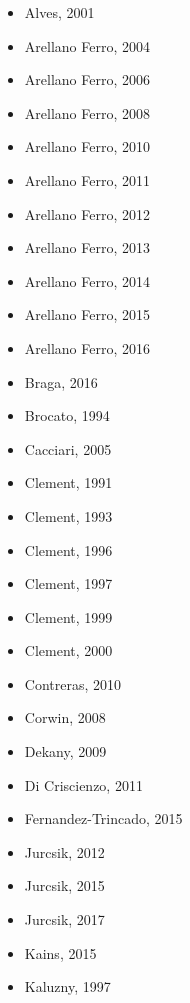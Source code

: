 \documentclass[]{article}
\begin{document}
\begin{itemize}
	\item Alves, 2001 \cite{alves_2001}
	\item Arellano Ferro, 2004 \cite{arellano_ferro_2004}
	\item Arellano Ferro, 2006 \cite{arellano_ferro_2006}
	\item Arellano Ferro, 2008 \cite{arellano_ferro_2008}
	\item Arellano Ferro, 2010 \cite{arellano_ferro_2010}
	\item Arellano Ferro, 2011 \cite{arellano_ferro_2011}
	\item Arellano Ferro, 2012 \cite{arellano_ferro_2012}
	\item Arellano Ferro, 2013 \cite{arellano_ferro_2013}
	\item Arellano Ferro, 2014 \cite{arellano_ferro_2014}
	\item Arellano Ferro, 2015 \cite{arellano_ferro_2015}
	\item Arellano Ferro, 2016 \cite{arellano_ferro_2016}
	\item Braga, 2016 \cite{braga_2016}
	\item Brocato, 1994 \cite{brocato_1994}
	\item Cacciari, 2005 \cite{cacciari_2005}
	\item Clement, 1991 \cite{clement_1991_b}
	\item Clement, 1993 \cite{clement_1993}
	\item Clement, 1996 \cite{clement_1996}
	\item Clement, 1997 \cite{clement_1997}
	\item Clement, 1999 \cite{clement_1999}
	\item Clement, 2000 \cite{clement_2000}
	\item Contreras, 2010 \cite{contreras_2010}
	\item Corwin, 2008 \cite{corwin_2008}
	\item Dekany, 2009 \cite{dekany_2009}
	\item Di Criscienzo, 2011 \cite{di_criscienzo_2011_b}
	\item Fernandez-Trincado, 2015 \cite{fernandez-trincado_2015}
	\item Jurcsik, 2012 \cite{jurcsik_2012}
	\item Jurcsik, 2015 \cite{jurcsik_2015}
	\item Jurcsik, 2017 \cite{jurcsik_2017}
	\item Kains, 2015 \cite{kains_2015}
	\item Kaluzny, 1997 \cite{kaluzny_1997}

\end{itemize}
\end{document}
